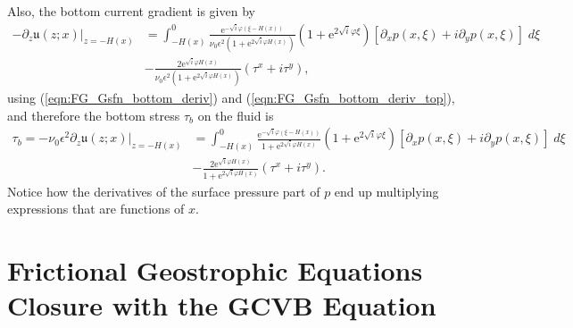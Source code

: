 \documentclass[10pt]{amsart}
\begin{document}
Also, the bottom current gradient is given by
\begin{align}
-\partial_z \left. \mathfrak{u} (z;x) \right|_{z = -H(x)} & =  \int_{-H(x)}^{0} 
 \frac{ \mathrm{e}^{-\sqrt{i} \varphi (\xi - H(x))  } }{ \nu_0 \epsilon^2 \left(1 + \mathrm{e}^{2 \sqrt{i} \varphi H \left(x \right)} \right)}
\left( 1 + \mathrm{e}^{2 \sqrt{i} \varphi \xi}\right) 
 \left[ \partial_x p( x, \xi) + i \partial_y p( x, \xi) \right] \; d \xi \nonumber \\
& - \frac{ 2 \mathrm{e}^{\sqrt{i} \varphi H(x)  } }{ \nu_0 \epsilon^2 \left(1 + \mathrm{e}^{2 \sqrt{i} \varphi H \left(x \right)} \right)}
\left( \tau^x + i \tau^y \right) ,
\end{align}
using (\ref{eqn:FG_Gsfn_bottom_deriv}) and (\ref{eqn:FG_Gsfn_bottom_deriv_top}), and therefore the bottom stress $\tau_b$ on the fluid is
\begin{align}
\tau_b = - \nu_0 \epsilon^2 \partial_z \left. \mathfrak{u} (z;x) \right|_{z = -H(x)} & = \int_{-H(x)}^{0} 
\frac{ \mathrm{e}^{-\sqrt{i} \varphi (\xi - H(x))  } }{ 1 + \mathrm{e}^{2 \sqrt{i} \varphi H \left(x \right)} }
\left( 1 + \mathrm{e}^{2 \sqrt{i} \varphi \xi}\right) 
 \left[ \partial_x p( x, \xi) + i \partial_y p( x, \xi) \right] \; d \xi \nonumber \\
&-\frac{ 2 \mathrm{e}^{\sqrt{i} \varphi H(x)  } }{ 1 + \mathrm{e}^{2 \sqrt{i} \varphi H \left(x \right)} }
 \left( \tau^x + i \tau^y \right) .
 \label{eqn:bottom_stress_expression}
 \end{align}
Notice how the derivatives of the surface pressure part of $p$ end up multiplying expressions that are functions of $x$.

\section{Frictional Geostrophic Equations Closure with the GCVB Equation}
\end{document}
